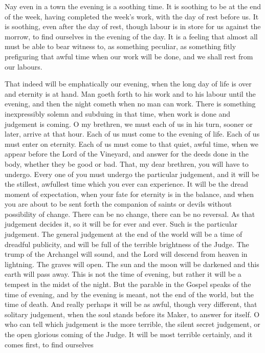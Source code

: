 Nay even in a town the evening is a soothing
time. It is soothing to be at the end of the week, having completed
the week's work, with the day of rest before us. It is soothing, even
after the day of rest, though labour is in store for us against the
morrow, to find ourselves in the evening of the day. It is a feeling
that almost all must be able to bear witness to, as something
peculiar, as something fitly prefiguring that awful time when our work
will be done, and we shall rest from our labours.

That indeed will be emphatically our evening,
when the long day of life is over and eternity is at hand. Man goeth
forth to his work and to his labour until the evening, and then the
night cometh when no man can work. There is something inexpressibly
solemn and subduing in that time, when work is done and judgement is
coming. O my brethren, we must each of us in his turn, sooner or
later, arrive at that hour. Each of us must come to the evening of
life. Each of us must enter on eternity. Each of us must come to that
quiet, awful time, when we appear before the Lord of the Vineyard, and
answer for the deeds done in the body, whether they be good or
bad. That, my dear brethren, you will have to undergo. Every one of
you must undergo the particular judgement, and it will be the
stillest, awfullest time which you ever can experience. It will be the
dread moment of expectation, when your fate for eternity is in the
balance, and when you are about to be sent forth the companion of
saints or devils without possibility of change. There can be no
change, there can be no reversal. As that judgement decides it, so it
will be for ever and ever. Such is the particular judgement. The
general judgement at the end of the world will be a time of dreadful
publicity, and will be full of the terrible brightness of the Judge.
The trump of the Archangel will sound, and the Lord will descend from
heaven in lightning. The graves will open. The sun and the moon will
be darkened and this earth will pass away. This is not the time of
evening, but rather it will be a tempest in the midst of the night.
But the parable in the Gospel speaks of the time of evening, and by
the evening is meant, not the end of the world, but the time of death.
And really perhaps it will be as awful, though very different, that
solitary judgement, when the soul stands before its Maker, to answer
for itself. O who can tell which judgement is the more terrible, the
silent secret judgement, or the open glorious coming of the Judge. It
will be most terrible certainly, and it comes first, to find ourselves
